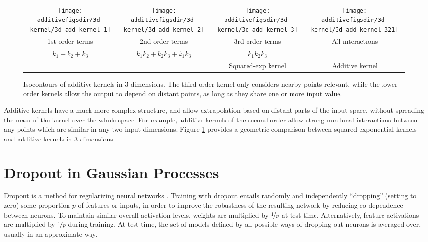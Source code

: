 \begin{figure}[ht!]
\centering
\begin{tabular}{cccc}
\hspace{-0.1in}
 \texttt{[image: \\additivefigsdir/3d-kernel/3d\_add\_kernel\_1]} &
\hspace{-0.2in} \texttt{[image: \\additivefigsdir/3d-kernel/3d\_add\_kernel\_2]} &
\hspace{-0.2in} \texttt{[image: \\additivefigsdir/3d-kernel/3d\_add\_kernel\_3]} & 
\hspace{-0.2in} \texttt{[image: \\additivefigsdir/3d-kernel/3d\_add\_kernel\_321]}\\
1st-order terms &
2nd-order terms & 
3rd-order terms & 
All interactions \\
$k_1 + k_2 + k_3$ & $k_1k_2 + k_2k_3 + k_1k_3$ & $k_1k_2k_3$ & \\
& & Squared-exp kernel & Additive kernel\\
\end{tabular}
\caption[Isocontours of additive kernels in 3 dimensions]
{Isocontours of additive kernels in 3 dimensions.
The third-order kernel only considers nearby points relevant, while the lower-order kernels allow the output to depend on distant points, as long as they share one or more input value.}
\label{fig:kernels3d}
\end{figure}

Additive kernels have a much more complex structure, and allow extrapolation based on distant parts of the input space, without spreading the mass of the kernel over the whole space.  For example, additive kernels of the second order allow strong non-local interactions between any points which are similar in any two input dimensions.
Figure \ref{fig:kernels3d} provides a geometric comparison between squared-exponential kernels and additive kernels in 3 dimensions.



\section{Dropout in Gaussian Processes}

Dropout is a method for regularizing neural networks \citep{hinton2012improving, srivastava2013improving}.
Training with dropout entails randomly and independently ``dropping'' (setting to zero) some proportion $p$ of features or inputs, in order to improve the robustness of the resulting network by reducing co-dependence between neurons.
To maintain similar overall activation levels, weights are multiplied by $\nicefrac{1}{p}$ at test time. Alternatively, feature activations are multiplied by $\nicefrac{1}{p}$ during training.
At test time, the set of models defined by all possible ways of dropping-out neurons is averaged over, usually in an approximate way.

